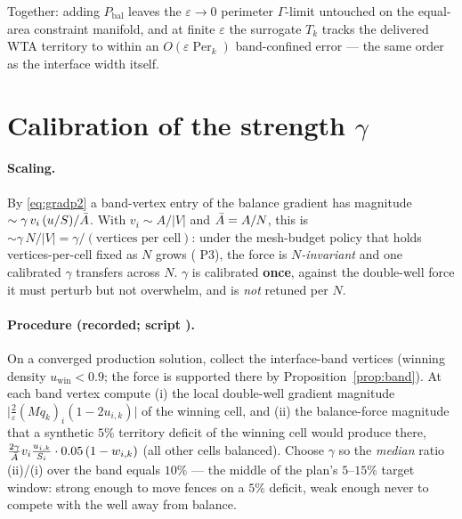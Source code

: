 \documentclass[11pt,a4paper]{article}
\begin{document}
Together: adding $P_{\mathrm{bal}}$ leaves the $\varepsilon\to0$ perimeter
$\Gamma$-limit untouched on the equal-area constraint manifold, and at finite
$\varepsilon$ the surrogate $T_k$ tracks the delivered WTA territory to
within an $O(\varepsilon\operatorname{Per}_k)$ band-confined error — the same
order as the interface width itself.

\section{Calibration of the strength \texorpdfstring{$\gamma$}{gamma}}
\label{sec:gamma}

\paragraph{Scaling.}
By \eqref{eq:gradp2} a band-vertex entry of the balance gradient has magnitude
$\sim \gamma\, v_i\,(u/S)/\bar{A}$. With $v_i \sim A/|V|$ and $\bar{A} = A/N$,
this is $\sim \gamma\,N/|V| = \gamma / (\text{vertices per cell})$: under the
mesh-budget policy that holds vertices-per-cell fixed as $N$ grows
( P3), the force is
\emph{$N$-invariant} and one calibrated $\gamma$ transfers across $N$.
$\gamma$ is calibrated \textbf{once}, against the double-well force it must
perturb but not overwhelm, and is \emph{not} retuned per $N$.

\paragraph{Procedure (recorded; script
).}
On a converged production solution, collect the interface-band vertices
(winning density $u_{\mathrm{win}} < 0.9$; the force is supported there by
Proposition~\ref{prop:band}). At each band vertex compute (i) the local
double-well gradient magnitude
$\bigl|\tfrac2\varepsilon (Mq_k)_i (1-2u_{i,k})\bigr|$ of the winning cell,
and (ii) the balance-force magnitude that a synthetic $5\%$ territory deficit
of the winning cell would produce there,
$\tfrac{2\gamma}{\bar{A}} v_i \tfrac{u_{i,k}}{S_i}\cdot 0.05\,(1-w_{i,k})$
(all other cells balanced). Choose $\gamma$ so the \emph{median} ratio
(ii)/(i) over the band equals $10\%$ — the middle of the plan's
$5$--$15\%$ target window: strong enough to move fences on a $5\%$ deficit,
weak enough never to compete with the well away from balance.
\end{document}
